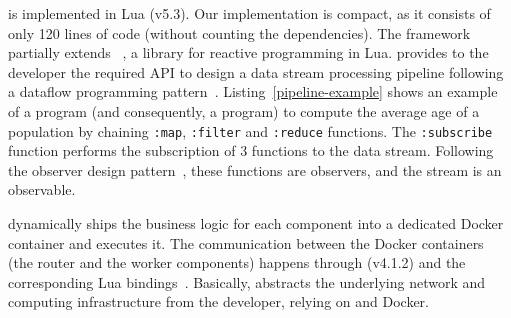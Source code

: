 \SYS is implemented in Lua (v5.3).
Our implementation is compact, as it consists of only 120 lines of code (without counting the dependencies).
The framework partially extends \rxl~\cite{github:rxlua}, a library for reactive programming in Lua.
\rxl provides to the developer the required API to design a data stream processing pipeline following a dataflow programming pattern~\cite{uustalu_essence_2005}.
Listing~\ref{pipeline-example} shows an example of a \rxl program (and consequently, a \SYS{} program) to compute the average age of a population by chaining \texttt{:map}, \texttt{:filter} and \texttt{:reduce} functions.
The \texttt{:subscribe} function performs the subscription of 3 functions to the data stream.
Following the observer design pattern~\cite{szallies_using_1997}, these functions are observers, and the stream is an observable.

\SYS{} dynamically ships the business logic for each component into a dedicated Docker container and executes it.
The communication between the Docker containers (the router and the worker components) happens through \zmq (v4.1.2) and the corresponding Lua bindings~\cite{github:lzmq}.
Basically, \SYS{} abstracts the underlying network and computing infrastructure from the developer, relying on \zmq and Docker.

